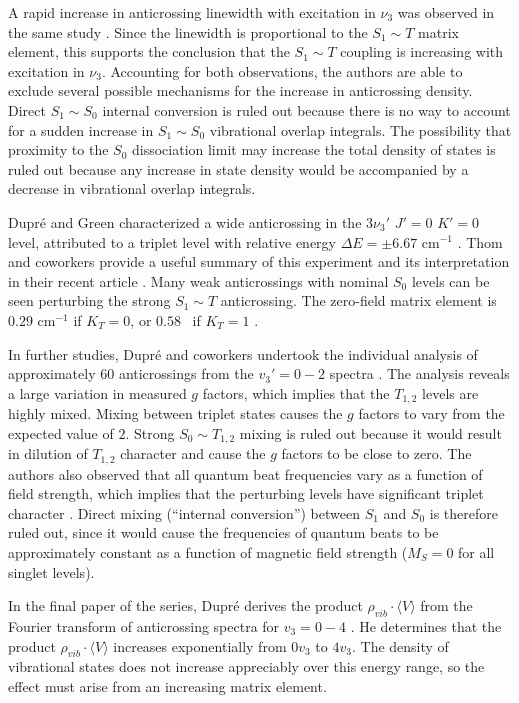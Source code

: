 A rapid increase in anticrossing linewidth with excitation in $\nu_3$
was observed in the same study \cite{dupre91}.  Since the linewidth is
proportional to the $S_1 \sim T$ matrix element, this supports the
conclusion that the $S_1 \sim T$ coupling is increasing with
excitation in $\nu_3$.  Accounting for both observations, the authors
are able to exclude several possible mechanisms for the increase in
anticrossing density.  Direct $S_1 \sim S_0$ internal conversion is
ruled out because there is no way to account for a sudden increase in
$S_1 \sim S_0$ vibrational overlap integrals.  The possibility that
proximity to the $S_0$ dissociation limit may increase the total
density of states is ruled out because any increase in state density
would be accompanied by a decrease in vibrational overlap integrals.

Dupr\'{e} and Green characterized a wide anticrossing in the $3\nu_3'$
$J'=0$ $K'=0$ level, attributed to a triplet level with relative
energy $\Delta E = \pm 6.67$ cm$^{-1}$ \cite{dupre93}.  Thom and
coworkers provide a useful summary of this experiment and its
interpretation in their recent article \cite{thom07}.  Many weak
anticrossings with nominal $S_0$ levels can be seen perturbing the
strong $S_1 \sim T$ anticrossing.  The zero-field matrix element is
$0.29$ cm$^{-1}$ if $K_{T}=0$, or $0.58$ \rcm\ if $K_{T}=1$
\cite{thom07}.

In further studies, Dupr\'{e} and coworkers undertook the individual
analysis of approximately 60 anticrossings from the $v_3'=0-2$
spectra \cite{dupre95a}.  The analysis reveals a large variation in
measured $g$ factors, which implies that the $T_{1,2}$ levels are
highly mixed.  Mixing between triplet states %
causes the $g$ factors to vary from the expected value of $2$.  Strong
$S_0 \sim T_{1,2}$ mixing is ruled out because it would result in
dilution of $T_{1,2}$ character and cause the $g$ factors to be close
to zero.  The authors also observed that all quantum beat frequencies
vary as a function of field strength, which implies that the
perturbing levels have significant triplet character \cite{dupre95a}.
Direct mixing (``internal conversion'') between $S_1$ and $S_0$ is
therefore ruled out, since it would cause the frequencies of quantum
beats to be approximately constant as a function of magnetic field
strength ($M_S=0$ for all singlet levels).

In the final paper of the series, Dupr\'{e} derives the product
$\rho_{vib} \cdot \langle V \rangle$ from the Fourier transform of
anticrossing spectra for $v_3=0-4$ \cite{dupre95b}.  He determines
that the product $\rho_{vib} \cdot \langle V \rangle$ increases
exponentially from $0v_3$ to $4v_3$.  The density of vibrational
states does not increase appreciably over this energy range, so the
effect must arise from an increasing matrix element.

